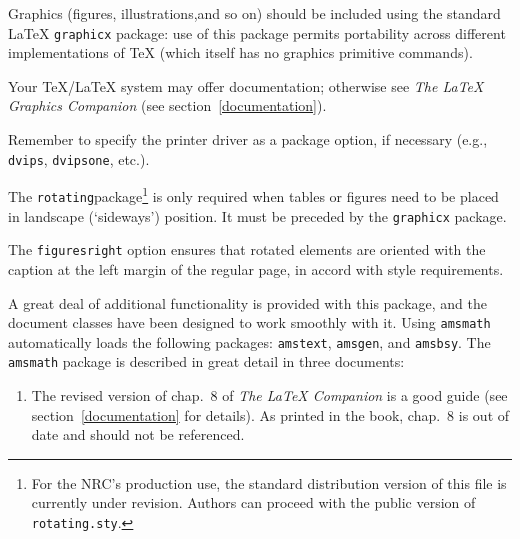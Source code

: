 \begin{description} \itemsep=0pt
   \item [{\tt \blash usepackage\char`\{graphicx\char`\}}]

         Graphics (figures, illustrations,\break and so on) should be
         included using the standard \LaTeX{} \texttt{graphicx}
         package: use of this package permits portability across
         different implementations of \TeX{} (which itself has no
         graphics primitive commands).

         Your \TeX/\LaTeX{} system may offer documentation; otherwise
         see \textsl{The \LaTeX{} Graphics Companion\/} (see
         section~\ref{documentation}).

         Remember to specify the printer driver as a package option,
         if necessary (e.g., \verb|dvips|, \verb|dvipsone|, etc.).

   \item [{\tt \blash usepackage[figuresright]\char`\{rotating\char`\}}]

         \quad The \verb|rotating|\break package\footnote{For the
         NRC's production use, the standard distribution version of
         this file is currently under revision. Authors can proceed
         with the public version of \texttt{rotating.sty}.} is only
         required when tables or figures need to be placed in
         landscape (`sideways') position. It must be preceded by the
         \verb|graphicx| package.

         The \verb|figuresright| option ensures that rotated
         elements are oriented with the caption at the left margin of
         the regular page, in accord with \NRC{} style requirements. 

   \item [{\tt \blash usepackage\char`\{amsmath\char`\}}]

         A great deal of additional functionality is provided with
         this package, and the \NRC{} document classes have been
         designed to work smoothly with it. Using \texttt{amsmath}
         automatically loads the following packages: \texttt{amstext},
         \texttt{amsgen}, and \texttt{amsbsy}. The \texttt{amsmath}
         package is described in great detail in three documents:

   \begin{enumerate} \itemsep=0pt
     \item The revised version of chap.~8 of {\sl The \LaTeX{}
           Companion} is a good guide (see section~\ref{documentation}
           for details). As printed in the book, chap.~8 is out of
           date and should not be referenced.


\end{enumerate}
\end{description}
